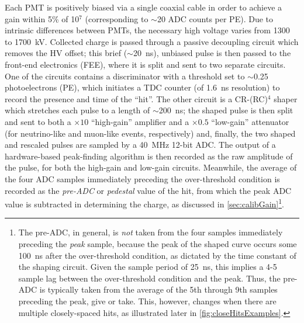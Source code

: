 \documentclass[../thesis.tex]{subfiles}
\begin{document}
Each PMT is positively biased via a single coaxial cable in order to achieve a gain within 5\% of 10$^7$ (corresponding to $\sim$20 ADC counts per PE). Due to intrinsic differences between PMTs, the necessary high voltage varies from 1300 to 1700~kV. Collected charge is passed through a passive decoupling circuit which removes the HV offset; this brief ($\sim$20~ns), unbiased pulse is then passed to the front-end electronics (FEE), where it is split and sent to two separate circuits. One of the circuits contains a discriminator with a threshold set to $\sim$0.25 photoelectrons (PE), which initiates a TDC counter (of 1.6~ns resolution) to record the presence and time of the ``hit''. The other circuit is a CR-(RC)$^4$ shaper which stretches each pulse to a length of $\sim$200~ns; the shaped pulse is then split and sent to both a $\times10$ ``high-gain'' amplifier and a $\times0.5$ ``low-gain'' attenuator (for neutrino-like and muon-like events, respectively) and, finally, the two shaped and rescaled pulses are sampled by a 40~MHz 12-bit ADC. The output of a hardware-based peak-finding algorithm is then recorded as the raw amplitude of the pulse, for both the high-gain and low-gain circuits. Meanwhile, the average of the four ADC samples immediately preceding the over-threshold condition is recorded as the \emph{pre-ADC} or \emph{pedestal} value of the hit, from which the peak ADC value is subtracted in determining the charge, as discussed in \autoref{sec:calibGain}\footnote{The pre-ADC, in general, is \emph{not} taken from the four samples immediately preceding the \emph{peak} sample, because the peak of the shaped curve occurs some 100~ns after the over-threshold condition, as dictated by the time constant of the shaping circuit. Given the sample period of 25~ns, this implies a 4-5 sample lag between the over-threshold condition and the peak. Thus, the pre-ADC is typically taken from the average of the 5th through 9th samples preceding the peak, give or take. This, however, changes when there are multiple closely-spaced hits, as illustrated later in \autoref{fig:closeHitsExamples}.}.
\end{document}
